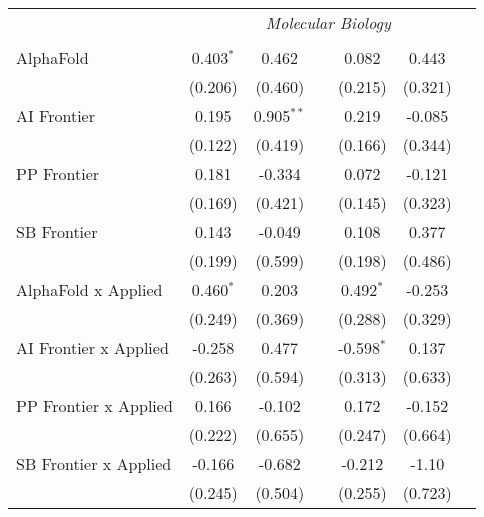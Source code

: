 \begin{tabular}{lcccccc}
 & \multicolumn{6}{c}{\textit{Molecular Biology}} \\ \\
   AlphaFold                      & 0.403$^{*}$ & 0.462        &               & 0.082        & 0.443   &   \\   
                                  & (0.206)     & (0.460)      &               & (0.215)      & (0.321) &   \\   
   AI Frontier                    & 0.195       & 0.905$^{**}$ &               & 0.219        & -0.085  &   \\   
                                  & (0.122)     & (0.419)      &               & (0.166)      & (0.344) &   \\   
   PP Frontier                    & 0.181       & -0.334       &               & 0.072        & -0.121  &   \\   
                                  & (0.169)     & (0.421)      &               & (0.145)      & (0.323) &   \\   
   SB Frontier                    & 0.143       & -0.049       &               & 0.108        & 0.377   &   \\   
                                  & (0.199)     & (0.599)      &               & (0.198)      & (0.486) &   \\   
   AlphaFold x Applied            & 0.460$^{*}$ & 0.203        &               & 0.492$^{*}$  & -0.253  &   \\   
                                  & (0.249)     & (0.369)      &               & (0.288)      & (0.329) &   \\   
   AI Frontier x Applied          & -0.258      & 0.477        &               & -0.598$^{*}$ & 0.137   &   \\   
                                  & (0.263)     & (0.594)      &               & (0.313)      & (0.633) &   \\   
   PP Frontier x Applied          & 0.166       & -0.102       &               & 0.172        & -0.152  &   \\   
                                  & (0.222)     & (0.655)      &               & (0.247)      & (0.664) &   \\   
   SB Frontier x Applied          & -0.166      & -0.682       &               & -0.212       & -1.10   &   \\   
                                  & (0.245)     & (0.504)      &               & (0.255)      & (0.723) &   \\   

\end{tabular}
